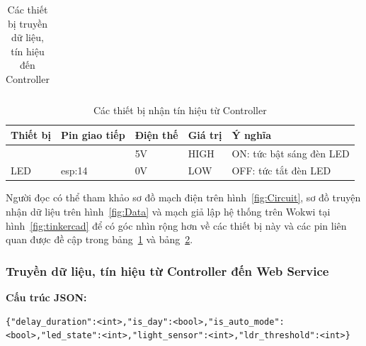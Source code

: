 {\begin{table}[H]
\begin{tabular}{|p{2.5cm}|p{2.5cm}|p{2.5cm}|p{2.5cm}|p{4.5cm}|}
\end{tabular}
\caption{Các thiết bị truyền dữ liệu, tín hiệu đến Controller}
\label{tab:data_photo_push}
\end{table}


\begin{table}[H]
\centering
\small
\begin{tabular}{|p{2.5cm}|p{2.5cm}|p{2.5cm}|p{2.5cm}|p{4.5cm}|}
\hline
{\textbf{Thiết bị}}     & {\textbf{Pin giao tiếp}} & {\textbf{Điện thế}} & {\textbf{Giá trị}} & {\textbf{Ý nghĩa}}         \\ \hline
{}                      & {}                       & {5V}                & {HIGH}             & {ON: tức bật sáng đèn LED} \\ \cline{3-5} 
\multirow{-2}{*}{{LED}} & \multirow{-2}{*}{{esp:14}}   & {0V}                & {LOW}              & {OFF: tức tắt đèn LED}     \\ \hline
\end{tabular}
\caption{Các thiết bị nhận tín hiệu từ Controller}
\label{tab:data_LED}
\end{table}

Người đọc có thể tham khảo sơ đồ mạch điện trên hình~\ref{fig:Circuit}, sơ đồ truyện nhận dữ liệu trên hình~\ref{fig:Data} và mạch giả lập hệ thống trên Wokwi tại hình~\ref{fig:tinkercad} để có góc nhìn rộng hơn về các thiết bị này và các pin liên quan được đề cập trong bảng~\ref{tab:data_photo_push} và bảng~\ref{tab:data_LED}. 

\pagebreak
\subsubsection{Truyền dữ liệu, tín hiệu từ Controller đến Web Service}\label{subsec:data_UNO_to_Web}
\textbf{Cấu trúc JSON:}
    \begin{lstlisting}
{"delay_duration":<int>,"is_day":<bool>,"is_auto_mode":<bool>,"led_state":<int>,"light_sensor":<int>,"ldr_threshold":<int>}\end{lstlisting}

}
